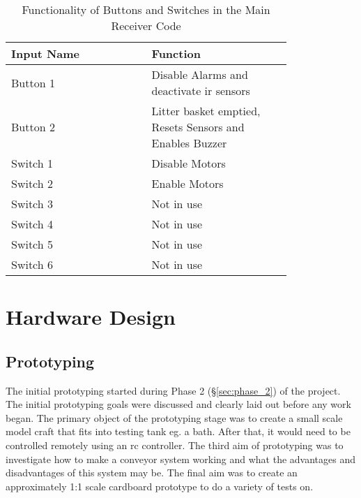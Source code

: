\documentclass [11pt]{article}
\begin{document}
\begin{table}[H]
\centering
\setlength{\arrayrulewidth}{1.5pt}
\begin{tabular}{|p{0.4\linewidth}|p{0.4\linewidth}|}
\hline
\cellcolor{gray!40}Input Name & \cellcolor{gray!40}Function \\ 
\hline
\cellcolor{gray!20} Button 1 & \cellcolor{gray!20} Disable Alarms and deactivate \gls{ir} sensors\\
\hline
\cellcolor{gray!20} Button 2 & \cellcolor{gray!20} Litter basket emptied, Resets Sensors and Enables Buzzer\\
\hline
\cellcolor{gray!20} Switch 1 & \cellcolor{gray!20} Disable Motors\\
\hline
\cellcolor{gray!20} Switch 2& \cellcolor{gray!20} Enable Motors\\
\hline
\cellcolor{gray!20} Switch 3 & \cellcolor{gray!20} Not in use\\
\hline
\cellcolor{gray!20} Switch 4 & \cellcolor{gray!20} Not in use\\
\hline
\cellcolor{gray!20} Switch 5 & \cellcolor{gray!20} Not in use\\
\hline
\cellcolor{gray!20} Switch 6 & \cellcolor{gray!20} Not in use\\
\hline
\end{tabular}
\caption{Functionality of Buttons and Switches in the Main Receiver Code }
\label{table:inputs_main_code}
\end{table}


\section{Hardware Design}
\subsection{Prototyping}

The initial prototyping started during Phase 2 (§\ref{sec:phase_2}) of the project. The initial prototyping goals were discussed and clearly laid out before any work began. The primary object of the prototyping stage was to create a small scale model craft that fits into testing tank eg. a bath. After that, it would need to be controlled remotely using an \gls{rc} controller. The third aim of prototyping was to investigate how to make a conveyor system working and what the advantages and disadvantages of this system may be. The final aim was to create an approximately 1:1 scale cardboard prototype to do a variety of tests on. 
\end{document}
